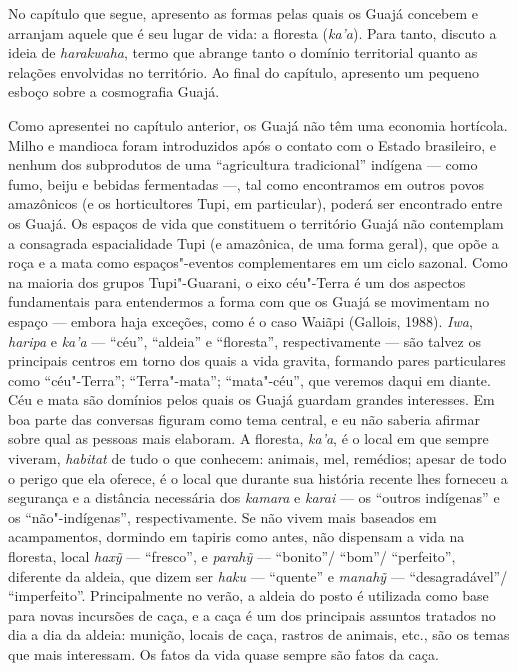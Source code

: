 No capítulo que segue, apresento as formas pelas quais os Guajá concebem
e arranjam aquele que é seu lugar de vida: a floresta (\emph{ka'a}).
Para tanto, discuto a ideia de \emph{harakwaha}, termo que abrange tanto
o domínio territorial quanto as relações envolvidas no território. Ao
final do capítulo, apresento um pequeno esboço sobre a cosmografia
Guajá.

Como apresentei no capítulo anterior, os Guajá não têm uma economia
hortícola. Milho e mandioca foram introduzidos após o contato com o
Estado brasileiro, e nenhum dos subprodutos de uma ``agricultura
tradicional'' indígena --- como fumo, beiju e bebidas fermentadas ---, tal
como encontramos em outros povos amazônicos (e os horticultores Tupi, em
particular), poderá ser encontrado entre os Guajá. Os espaços de vida
que constituem o território Guajá não contemplam a consagrada
espacialidade Tupi (e amazônica, de uma forma geral), que opõe a roça e
a mata como espaços"-eventos complementares em um ciclo sazonal. Como na
maioria dos grupos Tupi"-Guarani, o eixo céu"-Terra é um dos aspectos
fundamentais para entendermos a forma com que os Guajá se movimentam no
espaço --- embora haja exceções, como é o caso Waiãpi (Gallois, 1988).
\emph{Iwa}, \emph{haripa} e \emph{ka'a} --- ``céu'', ``aldeia'' e ``floresta'',
respectivamente --- são talvez os principais centros em torno dos quais a
vida gravita, formando pares particulares como ``céu"-Terra'';
``Terra"-mata''; ``mata"-céu'', que veremos daqui em diante. Céu e mata são
domínios pelos quais os Guajá guardam grandes interesses. Em boa parte
das conversas figuram como tema central, e eu não saberia afirmar sobre
qual as pessoas mais elaboram. A floresta, \emph{ka'a}, é o local em que
sempre viveram, \emph{habitat} de tudo o que conhecem: animais, mel,
remédios; apesar de todo o perigo que ela oferece, é o local que durante
sua história recente lhes forneceu a segurança e a distância necessária
dos \emph{kamara} e \emph{karai} --- os ``outros indígenas'' e os
``não"-indígenas'', respectivamente. Se não vivem mais baseados em
acampamentos, dormindo em tapiris como antes, não dispensam a vida na
floresta, local \emph{haxỹ} --- ``fresco'', e \emph{parahỹ} --- ``bonito''/
``bom''/ ``perfeito'', diferente da aldeia, que dizem ser \emph{haku} ---
``quente'' e \emph{manahỹ} --- ``desagradável''/ ``imperfeito''. Principalmente
no verão, a aldeia do posto é utilizada como base para novas incursões
de caça, e a caça é um dos principais assuntos tratados no dia a dia da
aldeia: munição, locais de caça, rastros de animais, etc., são os temas
que mais interessam. Os fatos da vida quase sempre são fatos da caça.

